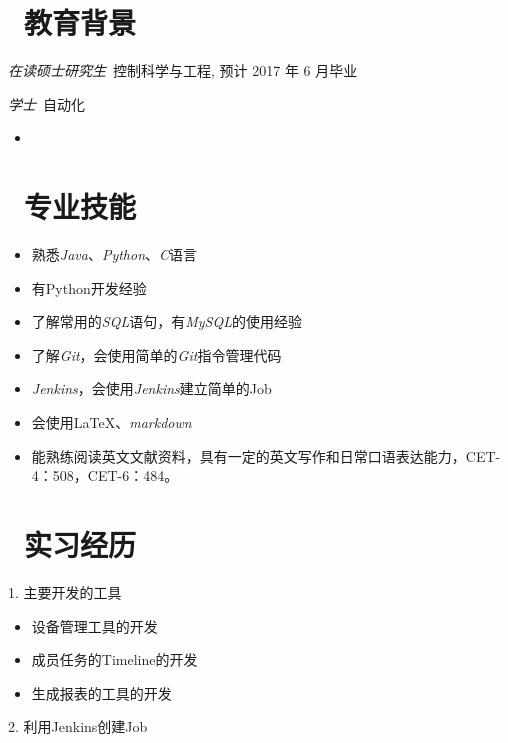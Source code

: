 \documentclass{resume}
\begin{document}



\section{\faGraduationCap\  教育背景}
\textit{在读硕士研究生}\ 控制科学与工程, 预计 2017 年 6 月毕业

\textit{学士}\ 自动化
\begin{itemize}
\item {}

\end{itemize}

\section{\faCogs\ 专业技能}
\begin{itemize}[parsep=1ex]
  \item 熟悉\emph{Java}、\emph{Python}、\emph{C}语言
  \item 有Python开发经验
  \item 了解常用的\emph{SQL}语句，有\emph{MySQL}的使用经验
  \item 了解\emph{Git}，会使用简单的\emph{Git}指令管理代码
  \item \emph{Jenkins}，会使用\emph{Jenkins}建立简单的Job
  \item 会使用\LaTeX 、\emph{markdown}
  \item 能熟练阅读英文文献资料，具有一定的英文写作和日常口语表达能力，CET-4：508，CET-6：484。

\end{itemize}
\section{\faUsers\ 实习经历}
1. 主要开发的工具
\begin{itemize}[parsep=0.5ex]
\item 设备管理工具的开发
\item 成员任务的Timeline的开发
\item 生成报表的工具的开发
\end{itemize}
2. 利用Jenkins创建Job  
\end{document}
